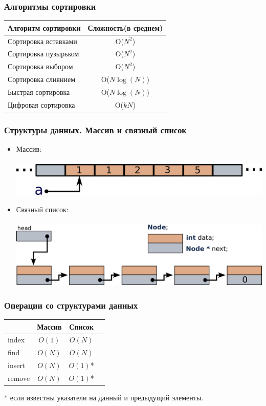 \documentclass[10pt]{beamer}
\begin{document}
\begin{frame}[fragile]
\frametitle{Алгоритмы сортировки}
\begin{center}
  \begin{tabular}{  l | c }
    Алгоритм сортировки & Сложность(в среднем) \\
    \hline
    Сортировка вставками & O($N^2$)\\
    Сортировка пузырьком & O($N^2$)\\
    Сортировка выбором & O($N^2$)\\
    \hline
    Сортировка слиянием & O($N\log(N)$)\\
    Быстрая сортировка & O($N\log(N)$)\\
    \hline
    Цифровая сортировка &  O($k N$) \\
  \end{tabular}
\end{center}
\end{frame}

\begin{frame}[fragile]
\frametitle{Структуры данных. Массив и связный список}
\begin{itemize}
\item Массив:\\
\quad\\
\includegraphics[width=0.8\linewidth]{images/array.png}
\item Связный список:\\
\quad\\
\includegraphics[width=0.8\linewidth]{images/list_initial.png}
\end{itemize}
\end{frame}

\begin{frame}[fragile]
\frametitle{Операции со структурами данных}
\begin{center}
  \begin{tabular}{  l | c c r }
      & Массив & Список \\
    \hline
    index & $O(1)$ & $O(N)$ \\
    find & $O(N)$ & $O(N)$  \\
    insert & $O(N)$ & $O(1)$*\\
    remove & $O(N)$ & $O(1)$*\\
    \hline
  \end{tabular}
\end{center}
* если известны указатели на данный и предыдущий элементы.
\end{frame}
\end{document}
